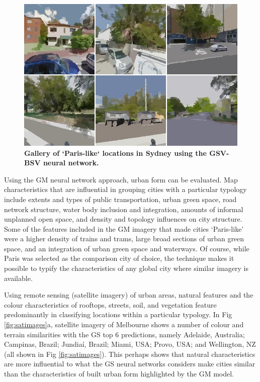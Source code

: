 \documentclass[Crown,sageh,times]{sagej}
\begin{document}
\begin{figure}[!htbp]
\centering    
\includegraphics[scale=0.35]{Images/PlosOne/Fig13.png}  
\caption{\bf Gallery of `Paris-like` locations in Sydney using the GSV-BSV neural network.}    
 \label{fig:gsv_syd_gallery}  
\end{figure} 

Using the GM neural network approach, urban form can be evaluated. Map characteristics that are influential in grouping cities with a particular typology include extents and types of public transportation, urban green space, road network structure, water body inclusion and integration, amounts of informal unplanned open space, and density and topology influences on city structure. Some of the features included in the GM imagery that made cities `Paris-like' were a higher density of trains and trams, large broad sections of urban green space, and an integration of urban green space and waterways. Of course, while Paris was selected as the comparison city of choice, the technique makes it possible to typify the characteristics of any global city where similar imagery is available.

Using remote sensing (satellite imagery) of urban areas, natural features and the colour characteristics of rooftops, streets, soil, and vegetation feature predominantly in classifying locations within a particular typology. In Fig \ref{fig:satimages}a, satellite imagery of Melbourne shows a number of colour and terrain similarities with the GS top 6 predictions, namely Adelaide, Australia; Campinas, Brazil; Jundia\'{i}, Brazil; Miami, USA; Provo, USA; and Wellington, NZ (all shown in Fig \ref{fig:satimages}). This perhaps shows that natural characteristics are more influential to what the GS neural networks considers make cities similar than the characteristics of built urban form highlighted by the GM model.
\end{document}
